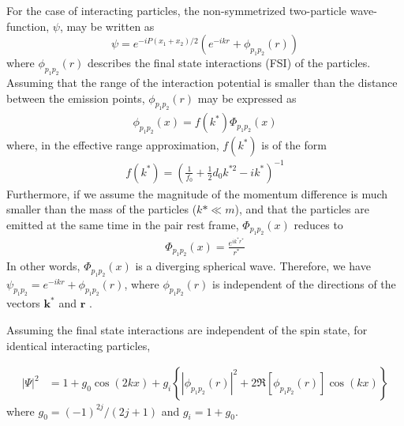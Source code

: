 \documentclass[/home/jesse/Analysis/FemtoAnalysis/AnalysisNotes/AnalysisNoteJBuxton.tex]{subfiles}
\begin{document}

For the case of interacting particles, the non-symmetrized two-particle wave-function, $\psi$, may be written as \cite{Lednicky:82}
\begin{equation}
\psi = e^{-iP(x_{1}+x_{2})/2}\left( e^{-ikr} + \phi_{p_{1}p_{2}}(r) \right)
\label{eqn:TempEq1}
\end{equation}
where $\phi_{p_{1}p_{2}}(r)$ describes the final state interactions (FSI) of the particles. 
Assuming that the range of the interaction potential is smaller than the distance between the emission points, $\phi_{p_{1}p_{2}}(r)$ may be expressed as 
\begin{equation}
\begin{aligned}
\phi_{p_{1}p_{2}}(x) = f(k^{*}) \Phi_{p_{1}p_{2}}(x)
\end{aligned}
\end{equation}
where, in the effective range approximation, $f(k^{*})$ is of the form
\begin{equation}
\begin{aligned}
f(k^{*}) = \left( \frac{1}{f_{0}} + \frac{1}{2}d_{0}k^{*2} - ik^{*} \right)^{-1}
\end{aligned}
\label{eqn:ScatteringParam}
\end{equation}
Furthermore, if we assume the magnitude of the momentum difference is much smaller than the mass of the particles ($k* \ll m$), and that the particles are emitted at the same time in the pair rest frame, $\Phi_{p_{1}p_{2}}(x)$ reduces to
\begin{equation}
\begin{aligned}
\Phi_{p_{1}p_{2}}(x) = \frac{e^{ik^{*}r^{*}}}{r^{*}}
\end{aligned}
\label{eqn:PhiP1P2SphericalWave}
\end{equation}
In other words, $\Phi_{p_{1}p_{2}}(x)$ is a diverging spherical wave.
Therefore, we have $\psi_{p_{1}p_{2}} = e^{-ikr} + \phi_{p_{1}p_{2}}(r)$, where $\phi_{p_{1}p_{2}}(r)$ is independent of the directions of the vectors $\boldsymbol k^{*}$ and $\boldsymbol r$ \cite{Lednicky:1995vk}.


Assuming the final state interactions are independent of the spin state, for identical interacting particles,

\begin{equation}
\begin{aligned}
|\Psi|^{2} &= 1 + g_{0}\cos(2kx) + g_{i}\left\lbrace|\phi_{p_{1}p_{2}}(r)|^{2} + 2\Re[\phi_{p_{1}p_{2}}(r)]\cos(kx)\right\rbrace
\end{aligned}
\label{eqn:IntIdPart_SpinIndependent}
\end{equation} 
where $g_{0} = (-1)^{2j}/(2j+1)$ and $g_{i} = 1+g_{0}$.
\end{document}
